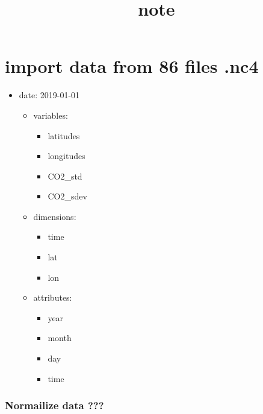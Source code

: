 \documentclass[11pt]{article}
\title{note}
\providecommand{\tightlist}{%
      \setlength{\itemsep}{0pt}\setlength{\parskip}{0pt}}
\begin{document}
    
    \maketitle
    
    

    
    \hypertarget{import-data-from-86-files-.nc4}{%
\section{import data from 86 files
.nc4}\label{import-data-from-86-files-.nc4}}

\begin{itemize}
\tightlist
\item
  date: 2019-01-01

  \begin{itemize}
  \tightlist
  \item
    variables:

    \begin{itemize}
    \tightlist
    \item
      latitudes
    \item
      longitudes
    \item
      CO2\_std
    \item
      CO2\_sdev
    \end{itemize}
  \item
    dimensions:

    \begin{itemize}
    \tightlist
    \item
      time
    \item
      lat
    \item
      lon
    \end{itemize}
  \item
    attributes:

    \begin{itemize}
    \tightlist
    \item
      year
    \item
      month
    \item
      day
    \item
      time
    \end{itemize}
  \end{itemize}
\end{itemize}

    \hypertarget{normailize-data}{%
\subsubsection{Normailize data ???}\label{normailize-data}}
\end{document}
